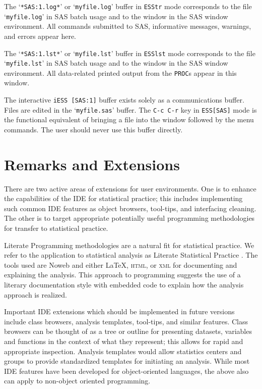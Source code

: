 \documentclass{article}
\newcommand{\stexttt}[1]{{\small\texttt{#1}}}
\newcommand{\ssf}[1]{{\small\sf{#1}}}
\newcommand{\file}[1]{`\stexttt{#1}'}
\begin{document}
The \file{*SAS:1.log*} or \file{myfile.log} buffer in \stexttt{ESStr}
mode corresponds to the file \file{myfile.log} in SAS batch usage and to
the \ssf{SAS: LOG} window in the SAS window environment.  All commands
submitted to SAS, informative messages, warnings, and errors appear
here.

The \file{*SAS:1.lst*} or \file{myfile.lst} buffer in \stexttt{ESSlst}
mode corresponds to the file \file{myfile.lst} in SAS batch usage and to
the \ssf{SAS: OUTPUT} window in the SAS window environment.  All
data-related printed output from the \stexttt{PROC}s appear in this
window.

The interactive \stexttt{iESS [SAS:1]} buffer exists solely as a
communications buffer.  Files are edited in the \file{myfile.sas}
buffer.  The \stexttt{C-c C-r} key in \stexttt{ESS[SAS]} mode is the
functional equivalent of bringing a file into the \ssf{SAS: PROGRAM
  EDITOR} window followed by the \ssf{Local/Submit} menu commands.  The
user should never use this buffer directly.

\section{Remarks and Extensions}
\label{sec:remarks}

There are two active areas of extensions for user environments.  One
is to enhance the capabilities of the IDE for statistical practice;
this includes implementing such common IDE features as object
browsers, tool-tips, and interfacing cleaning.  The other is to
target appropriate potentially useful programming methodologies for
transfer to statistical practice.

Literate Programming methodologies \citep{Knuth:1992,NRamsey:1994} are
a natural fit for statistical practice.  We refer to the application
to statistical analysis as Literate Statistical Practice
\citep{rossini:dsc:2001}.  The tools used are Noweb
\citep{NRamsey:1994} and either \LaTeX, \textsc{html}, or \textsc{xml}
for documenting and explaining the analysis.  This approach to
programming suggests the use of a literary documentation style with
embedded code to explain how the analysis approach is realized.

Important IDE extensions which should be implemented in future
versions include class browsers, analysis templates, tool-tips, and
similar features.  Class browsers can be thought of as a tree or
outline for presenting datasets, variables and functions in the
context of what they represent; this allows for rapid and appropriate
inspection.  Analysis templates would allow statistics centers and
groups to provide standardized templates for initiating an analysis.
While most IDE features have been developed for object-oriented
languages, the above also can apply to non-object oriented
programming.
\end{document}
